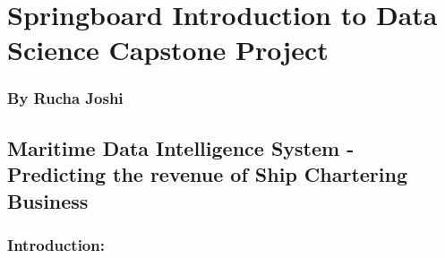 \documentclass[]{article}
\title{}
\author{}
\date{}
\begin{document}
\section{Springboard Introduction to Data Science Capstone
Project}\label{springboard-introduction-to-data-science-capstone-project}

\subsubsection{By Rucha Joshi}\label{by-rucha-joshi}

\subsection{\texorpdfstring{\textbf{Maritime Data Intelligence System -
Predicting the revenue of Ship Chartering
Business}}{Maritime Data Intelligence System - Predicting the revenue of Ship Chartering Business}}\label{maritime-data-intelligence-system---predicting-the-revenue-of-ship-chartering-business}

\subsubsection{\texorpdfstring{\textbf{Introduction:}}{Introduction:}}\label{introduction}
\end{document}

